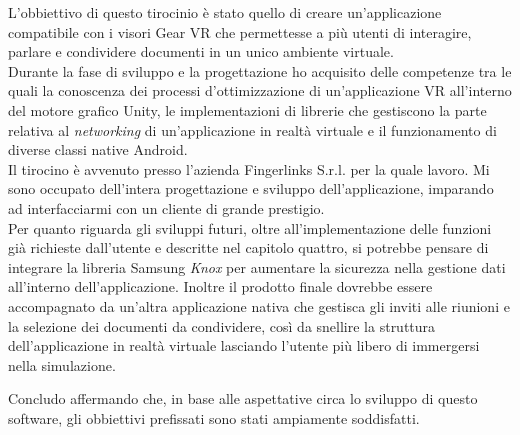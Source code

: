 L'obbiettivo di questo tirocinio è stato quello di creare un'applicazione compatibile con i visori Gear VR che permettesse a più utenti di interagire, parlare e condividere documenti in un unico ambiente virtuale.\\

Durante la fase di sviluppo e la progettazione ho acquisito delle competenze tra le quali la conoscenza dei processi d'ottimizzazione di un'applicazione VR all'interno del motore grafico Unity, le implementazioni di librerie che gestiscono la parte relativa al \textit{networking} di un'applicazione in realtà virtuale e il funzionamento di diverse classi native Android. \\

Il tirocino è avvenuto presso l'azienda Fingerlinks S.r.l. per la quale lavoro. Mi sono occupato dell'intera progettazione e sviluppo dell'applicazione, imparando ad interfacciarmi con un cliente di grande prestigio.\\

Per quanto riguarda gli sviluppi futuri, oltre all'implementazione delle funzioni già richieste dall'utente e descritte nel capitolo quattro, si potrebbe pensare di integrare la libreria Samsung \textit{Knox} per aumentare la sicurezza nella gestione dati all'interno dell'applicazione. Inoltre il prodotto finale dovrebbe essere accompagnato da un'altra applicazione nativa che gestisca gli inviti alle riunioni e la selezione dei documenti da condividere, così da snellire la struttura dell'applicazione in realtà virtuale lasciando l'utente più libero di immergersi nella simulazione.

Concludo affermando che, in base alle aspettative circa lo sviluppo di questo software, gli obbiettivi prefissati sono stati ampiamente soddisfatti.